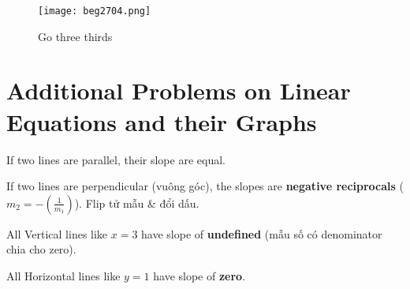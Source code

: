 \begin{figure}[htb!]
  \centering
  \texttt{[image: beg2704.png]}
  \caption{Go three thirds}
\end{figure}

\section{Additional Problems on Linear Equations and their Graphs}

If two lines are parallel, their slope are equal.

If two lines are perpendicular (vuông góc), the slopes are \textbf{negative reciprocals} ($m_{2}=-(\frac{1}{m_{1}})$). Flip tử mẫu \& đổi dấu.


\vspace{.4cm}

All Vertical lines like $x=3$ have slope of \textbf{undefined} (mẫu số có denominator chia cho zero).

All Horizontal lines like $y=1$ have slope of \textbf{zero}.

